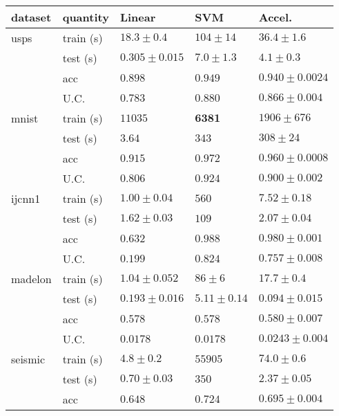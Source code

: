 \begin{tabular}{|ll|lll|}
\hline
dataset & quantity & Linear & SVM & Accel. \\
\hline\hline
usps & train (s) & $\mathbf{        18.3\pm     0.4}$ & $         104\pm       14$ & $        36.4\pm      1.6$\\
     & test (s)       & $\mathbf{0.305\pm    0.015}$ & $        7.0\pm      1.3$ & $4.1\pm     0.3$\\
 & acc       & $       0.898$ & $\mathbf{       0.949}$ & $        0.940\pm   0.0024$\\
 & U.C.      & $0.783$ & $\mathbf{0.880}$ & $       0.866\pm   0.004$\\
\hline
mnist & train (s) & $     11035$ & $\mathbf{    6381}$ & $    1906\pm  676$\\
 & test (s)       & $\mathbf{        3.64}$ & $         343$ & $         308\pm       24$\\
 & acc       & $ 0.915$ & $\mathbf{       0.972}$ & $        0.960\pm  0.0008$\\
 & U.C.      & $ 0.806$ & $       \mathbf{0.924}$ & $         0.900\pm   0.002$\\
\hline
ijcnn1 & train (s) & $\mathbf{        1.00\pm0.04}$ & $         560$ & $        7.52\pm     0.18$\\
 & test (s)       & $\mathbf{        1.62\pm0.03}$ & $         109$ & $        2.07\pm    0.04$\\
 & acc       & $       0.632$ & $\mathbf{       0.988}$ & $        0.980\pm   0.001$\\
 & U.C.      & $0.199$ & $\mathbf{0.824}$ & $       0.757\pm   0.008$\\
\hline
madelon & train (s) & $\mathbf{        1.04\pm    0.052}$ & $        86\pm      6$ & $        17.7\pm     0.4$\\
 & test (s)       & $       0.193\pm    0.016$ & $        5.11\pm     0.14$ & $\mathbf{       0.094\pm    0.015}$\\
 & acc       & $       0.578$ & $       0.578$ & $\mathbf{        0.580\pm   0.007}$\\
 & U.C.      & $0.0178$ & $      0.0178$ & $\mathbf{0.0243\pm   0.004}$\\
\hline
seismic & train (s) & $\mathbf{        4.8\pm0.2}$ & $    55905$ & $          74.0\pm     0.6$\\
	       & test (s)       & $\mathbf{0.70\pm0.03}$ & $         350$ & $2.37\pm    0.05$\\
 & acc       & $       0.648$ & $\mathbf{       0.724}$ & $       0.695\pm   0.004$\\

\end{tabular}
